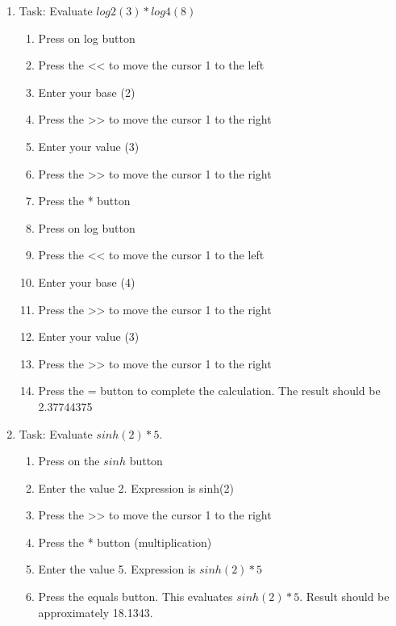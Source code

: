 \begin{enumerate}
            \item Task: Evaluate $log2(3) * log4(8)$
                \begin{enumerate}
                	\item Press on log button
                	\item Press the << to move the cursor 1 to the left
                	\item Enter your base (2)
                	\item Press the >> to move the cursor 1 to the right
                	\item Enter your value (3)
                	\item Press the >> to move the cursor 1 to the right
                	\item Press the * button
                	\item Press on log button
                	\item Press the << to move the cursor 1 to the left
                	\item Enter your base (4)
                	\item Press the >> to move the cursor 1 to the right
                	\item Enter your value (3)
                	\item Press the >> to move the cursor 1 to the right
                    \item Press the = button to complete the calculation. The result should be 2.37744375
                \end{enumerate}

            \item Task: Evaluate $sinh(2)*5$.
                \begin{enumerate}
                    \item Press on the $sinh$ button
                    \item Enter the value 2. Expression is sinh(2)
                	\item Press the >> to move the cursor 1 to the right
                    \item Press the * button (multiplication)
                    \item Enter the value 5. Expression is $sinh(2)*5$
                    \item Press the equals button. This evaluates  $sinh(2)*5$. Result should be approximately 18.1343.
                \end{enumerate}


\end{enumerate}
